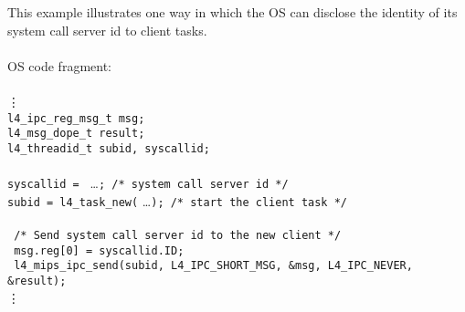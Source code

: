 
This example illustrates one way in which the OS can disclose the
identity of its system call server id to client tasks. \\ \\ 

\hspace*{10pt} OS code fragment: \\ \\
\hspace*{50pt} \vdots \\
\hspace*{20pt} {\footnotesize\verb+l4_ipc_reg_msg_t msg;+} \\
\hspace*{20pt} {\footnotesize\verb+l4_msg_dope_t result;+} \\
\hspace*{20pt} {\footnotesize\verb+l4_threadid_t subid, syscallid;+} \\ \\
\hspace*{20pt} {\footnotesize\verb+syscallid = +} \ldots {\footnotesize\verb+; /* system call server id */+} \\
\hspace*{20pt} {\footnotesize\verb+subid = l4_task_new(+} \ldots {\footnotesize\verb+); /* start the client task */+} \\ \\
\hspace*{30pt} {\footnotesize\verb+ /* Send system call server id to the new client */+} \\
\hspace*{20pt} {\footnotesize\verb+ msg.reg[0] = syscallid.ID;+} \\
\hspace*{20pt} {\footnotesize\verb+ l4_mips_ipc_send(subid, L4_IPC_SHORT_MSG, &msg, L4_IPC_NEVER, &result);+} \\
\hspace*{50pt} \vdots \\ \\

